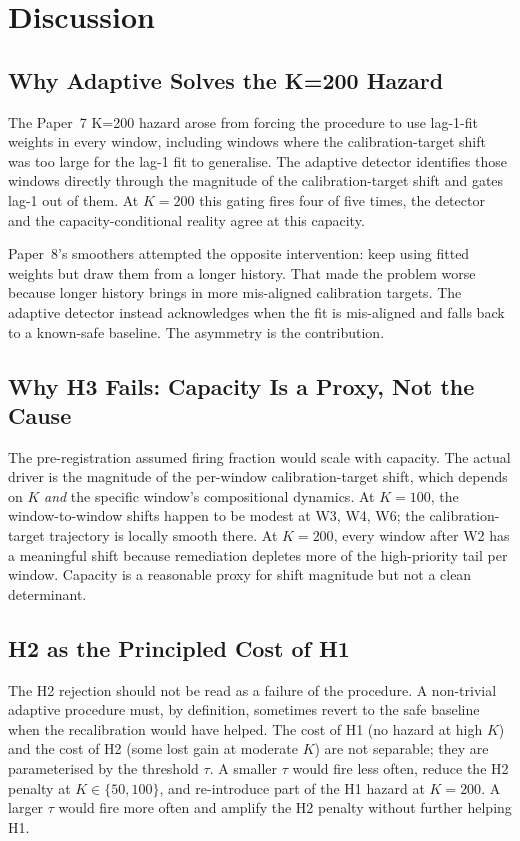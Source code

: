 \section{Discussion}

\subsection{Why Adaptive Solves the K=200 Hazard}

The Paper~7 K=200 hazard arose from forcing the procedure to use
lag-1-fit weights in every window, including windows where the
calibration-target shift was too large for the lag-1 fit to
generalise. The adaptive detector identifies those windows directly
through the magnitude of the calibration-target shift and gates lag-1
out of them. At $K = 200$ this gating fires four of five times, the
detector and the capacity-conditional reality agree at this capacity.

Paper~8's smoothers attempted the opposite intervention: keep using
fitted weights but draw them from a longer history. That made the
problem worse because longer history brings in more mis-aligned
calibration targets. The adaptive detector instead acknowledges
when the fit is mis-aligned and falls back to a known-safe baseline.
The asymmetry is the contribution.

\subsection{Why H3 Fails: Capacity Is a Proxy, Not the Cause}

The pre-registration assumed firing fraction would scale with
capacity. The actual driver is the magnitude of the per-window
calibration-target shift, which depends on $K$ \textit{and} the
specific window's compositional dynamics. At $K = 100$, the
window-to-window shifts happen to be modest at W3, W4, W6;
the calibration-target trajectory is locally smooth there. At
$K = 200$, every window after W2 has a meaningful shift because
remediation depletes more of the high-priority tail per window.
Capacity is a reasonable proxy for shift magnitude but not a clean
determinant.

\subsection{H2 as the Principled Cost of H1}

The H2 rejection should not be read as a failure of the procedure.
A non-trivial adaptive procedure must, by definition, sometimes
revert to the safe baseline when the recalibration would have
helped. The cost of H1 (no hazard at high $K$) and the cost of H2
(some lost gain at moderate $K$) are not separable; they are
parameterised by the threshold $\tau$. A smaller $\tau$ would fire
less often, reduce the H2 penalty at $K \in \{50, 100\}$, and
re-introduce part of the H1 hazard at $K = 200$. A larger $\tau$
would fire more often and amplify the H2 penalty without further
helping H1.

